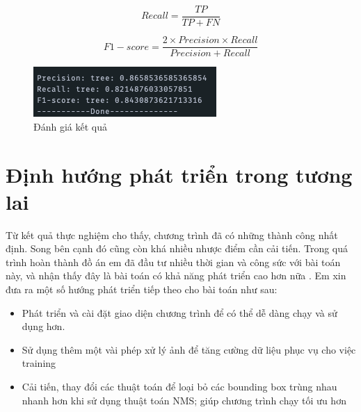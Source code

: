 \documentclass[a4paper, 12pt]{report}
\begin{document}
\begin{equation*}
	Recall = \frac{TP}{TP + FN}
\end{equation*}

\begin{equation*}
	F1 - score = \frac{2 \times Precision \times Recall}{Precision + Recall}
\end{equation*}
\begin{figure}[!h]
	\centering
  	\includegraphics[width=.8\linewidth]{Images/f1-score} %
 	 \caption{Đánh giá kết quả}
 	 \label{fig:sub1}
\end{figure}

\section{Định hướng phát triển trong tương lai}
Từ kết quả thực nghiệm cho thấy, chương trình đã có những thành công nhất định. Song bên cạnh đó cũng còn khá nhiều nhược điểm cần cải tiến. Trong quá trình hoàn thành đồ án em đã đầu tư nhiều thời gian và công sức với bài toán này, và nhận thấy đây là bài toán có khả năng phát triển cao hơn nữa . Em xin đưa ra một số hướng phát triển tiếp theo cho bài toán như sau:
\begin{itemize}
	\item Phát triển và cài đặt giao diện chương trình để có thể dễ dàng chạy và sử dụng hơn. 
	\item Sử dụng thêm một vài phép xử lý ảnh để tăng cường dữ liệu phục vụ cho việc training 
	\item Cải tiến, thay đổi các thuật toán để loại bỏ các bounding box trùng nhau nhanh hơn khi sử dụng thuật toán NMS; giúp chương trình chạy tối ưu hơn
\end{itemize}




\end{document}
